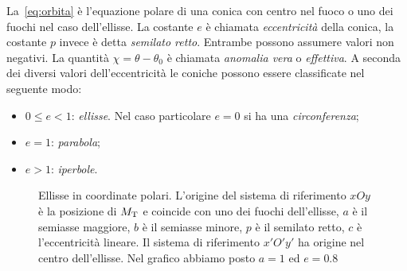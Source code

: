La~\eqref{eq:orbita} è l'equazione polare di una conica con centro nel fuoco o
uno dei fuochi nel caso dell'ellisse. La costante $e$ è chiamata
\emph{eccentricità} della conica, la costante $p$ invece è detta
\emph{semilato retto}. Entrambe possono assumere valori non negativi. La
quantità $\chi = \theta - \theta_0$ è chiamata \emph{anomalia vera} o
\emph{effettiva}. A seconda dei diversi valori dell'eccentricità le coniche
possono essere classificate nel seguente modo:
\begin{itemize}
\item $0\leq e<1$: \emph{ellisse}. Nel caso particolare $e=0$ si ha una
  \emph{circonferenza};
\item $e=1$: \emph{parabola};
\item $e>1$: \emph{iperbole}.
\end{itemize}
\begin{figure}
  \centering
  \caption[Ellisse in coordinate polari]{Ellisse in coordinate polari. L'origine
    del sistema di riferimento $xOy$ è la posizione di $M_\textup{T}$ e coincide
    con uno dei fuochi dell'ellisse, $a$ è il semiasse maggiore, $b$ è il
    semiasse minore, $p$ è il semilato retto, $c$ è l'eccentricità lineare. Il
    sistema di riferimento $x'O'y'$ ha origine nel centro dell'ellisse. Nel
    grafico abbiamo posto $a=1$ ed $e=0.8$}
  \label{fig:ellisse}
\end{figure}

